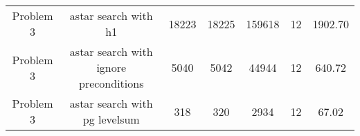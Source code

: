 \documentclass[12pt,a4paper]{article}
\begin{document}
\begin{landscape}
\begin{center}
\begin{tabular}[pos]{c|c|c|c|c|c|c}
Problem 3 & astar search with h1     & 18223         & 18225         & 159618       & 12           & 1902.70 \\
Problem 3 & astar search with ignore preconditions     & 5040         & 5042         & 44944       & 12           & 640.72 \\
Problem 3 & astar search with pg levelsum     & 318         & 320         & 2934       & 12           & 67.02 \\
        
\end{tabular}
\end{center}
\end{landscape}
\end{document}
